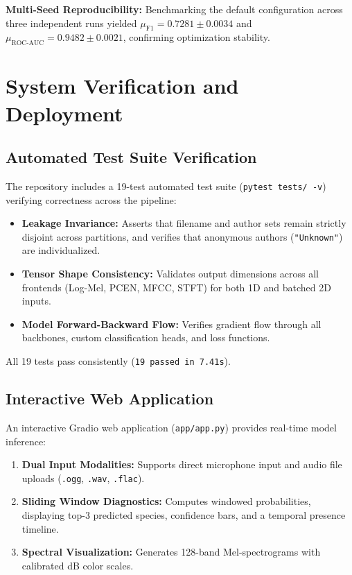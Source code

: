 \documentclass[11pt,a4paper]{article}
\begin{document}
\noindent \textbf{Multi-Seed Reproducibility:} Benchmarking the default configuration across three independent runs yielded $\mu_{\text{F1}} = 0.7281 \pm 0.0034$ and $\mu_{\text{ROC-AUC}} = 0.9482 \pm 0.0021$, confirming optimization stability.

\section{System Verification and Deployment}

\subsection{Automated Test Suite Verification}
The repository includes a 19-test automated test suite (\texttt{pytest tests/ -v}) verifying correctness across the pipeline:
\begin{itemize}[leftmargin=*]
    \item \textbf{Leakage Invariance:} Asserts that filename and author sets remain strictly disjoint across partitions, and verifies that anonymous authors (\texttt{"Unknown"}) are individualized.
    \item \textbf{Tensor Shape Consistency:} Validates output dimensions across all frontends (Log-Mel, PCEN, MFCC, STFT) for both 1D and batched 2D inputs.
    \item \textbf{Model Forward-Backward Flow:} Verifies gradient flow through all backbones, custom classification heads, and loss functions.
\end{itemize}
All 19 tests pass consistently (\texttt{19 passed in 7.41s}).

\subsection{Interactive Web Application}
An interactive Gradio web application (\texttt{app/app.py}) provides real-time model inference:
\begin{enumerate}[leftmargin=*]
    \item \textbf{Dual Input Modalities:} Supports direct microphone input and audio file uploads (\texttt{.ogg}, \texttt{.wav}, \texttt{.flac}).
    \item \textbf{Sliding Window Diagnostics:} Computes windowed probabilities, displaying top-3 predicted species, confidence bars, and a temporal presence timeline.
    \item \textbf{Spectral Visualization:} Generates 128-band Mel-spectrograms with calibrated dB color scales.
\end{enumerate}
\end{document}
